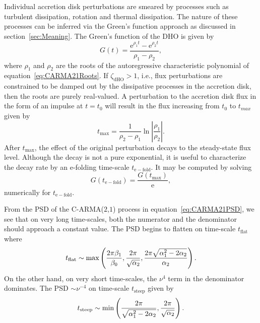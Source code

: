 \documentclass[a4paper,fleqn,usenatbib]{mnras}
\begin{document}
Individual accretion disk perturbations are smeared by processes such as turbulent dissipation, rotation and thermal dissipation. The nature of these processes can be inferred via the Green's function approach as discussed in section~\ref{sec:Meaning}. The Green's function of the DHO is given by
\begin{equation}\label{eq:DHOGFunc}
G(t) = \frac{\mathrm{e}^{\rho_{1}t} - \mathrm{e}^{\rho_{2}t}}{\rho_{1} - \rho_{2}},
\end{equation}
where $\rho_{1}$ and $\rho_{2}$ are the roots of the autoregressive characteristic polynomial of equation~\eqref{eq:CARMA21Roots}. If $\zeta_{\mathrm{dHO}} > 1$, i.e., flux perturbations are constrained to be damped out by the dissipative processes in the accretion disk, then the roots are purely real-valued. A perturbation to the accretion disk flux in the form of an impulse at $t = t_{0}$ will result in the flux increasing from $t_{0}$ to $t_{max}$ given by
\begin{equation}\label{eq:maxT}
t_{\mathrm{max}} = \frac{1}{\rho_{2} - \rho_{1}} \ln \left| \frac{\rho_{1}}{\rho_{2}} \right|.
\end{equation}
After $t_{\mathrm{max}}$, the effect of the original perturbation decays to the steady-state flux level. Although the decay is not a pure exponential, it is useful to characterize the decay rate by an e-folding time-scale $t_{\mathrm{e-fold}}$. It may be computed by solving
\begin{equation}\label{eq:TEFold}
G(t_{\mathrm{e-fold}}) = \frac{G(t_{\mathrm{max}})}{\mathrm{e}},
\end{equation}
numerically for $t_{\mathrm{e-fold}}$.

From the PSD of the C-ARMA($2$,$1$) process in equation~\eqref{eq:CARMA21PSD}, we see that on very long time-scales, both the numerator and the denominator should approach a constant value. The PSD begins to flatten on time-scale $t_{\mathrm{flat}}$ where
\begin{equation}\label{eq:TFLAT}
t_{\mathrm{flat}} \sim \max \left( \frac{2\pi \beta_{1}}{\beta_{0}},\frac{2\pi}{\sqrt{\alpha_{2}}},\frac{2\pi \sqrt{\alpha_{1}^{2}-2\alpha_{2}}}{\alpha_{2}} \right).
\end{equation}
On the other hand, on very short time-scales, the $\nu^{4}$ term in the denominator dominates. The PSD $\sim \nu^{-4}$ on time-scale $t_{\mathrm{steep}}$ given by
\begin{equation}\label{eq:STEEP}
t_{\mathrm{steep}} \sim \min \left( \frac{2\pi}{\sqrt{\alpha_{1}^{2} - 2\alpha_{2}}}, \frac{2\pi}{\sqrt{\alpha_{2}}}  \right).
\end{equation}
\end{document}
